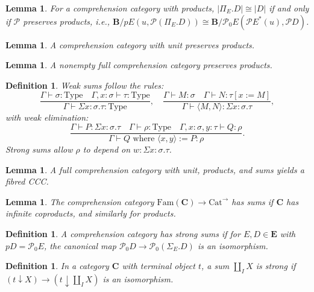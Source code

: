 \documentclass{article}
\theoremstyle{plain}
\newtheorem{lemma}[theorem]{Lemma}
\newtheorem{definition}[theorem]{Definition}
\theoremstyle{remark}
\begin{document}
\begin{lemma}
\label{lem:5.2}
For a comprehension category with products, $|\Pi_E . D| \cong |D|$ if and only if $\mathscr{P}$ preserves products, i.e., $\mathbf{B}/p E(u, \mathscr{P}(\Pi_E . D)) \cong \mathbf{B}/\mathscr{P}_0 E(\mathscr{P} E^*(u), \mathscr{P} D)$.
\end{lemma}

\begin{lemma}
\label{lem:5.3}
A comprehension category with unit preserves products.
\end{lemma}

\begin{lemma}
\label{lem:5.4}
A nonempty full comprehension category preserves products.
\end{lemma}

\begin{definition}
\label{def:5.5}
Weak sums follow the rules:
\[
\frac{\Gamma \vdash \sigma : \text{Type} \quad \Gamma, x : \sigma \vdash \tau : \text{Type}}{\Gamma \vdash \Sigma x : \sigma . \tau : \text{Type}}, \quad \frac{\Gamma \vdash M : \sigma \quad \Gamma \vdash N : \tau[x := M]}{\Gamma \vdash \langle M, N \rangle : \Sigma x : \sigma . \tau},
\]
with weak elimination:
\[
\frac{\Gamma \vdash P : \Sigma x : \sigma . \tau \quad \Gamma \vdash \rho : \text{Type} \quad \Gamma, x : \sigma, y : \tau \vdash Q : \rho}{\Gamma \vdash Q \text{ where } \langle x, y \rangle := P : \rho}.
\]
Strong sums allow $\rho$ to depend on $w : \Sigma x : \sigma . \tau$.
\end{definition}

\begin{lemma}
\label{lem:5.6}
A full comprehension category with unit, products, and sums yields a fibred CCC.
\end{lemma}

\begin{lemma}
\label{lem:5.7}
The comprehension category $\text{Fam}(\mathbf{C}) \to \text{Cat}^{\to}$ has sums if $\mathbf{C}$ has infinite coproducts, and similarly for products.
\end{lemma}

\begin{definition}
\label{def:5.8}
A comprehension category has \emph{strong sums} if for $E, D \in \mathbf{E}$ with $p D = \mathscr{P}_0 E$, the canonical map $\mathscr{P}_0 D \to \mathscr{P}_0 (\Sigma_E . D)$ is an isomorphism.
\end{definition}

\begin{definition}
\label{def:5.9}
In a category $\mathbf{C}$ with terminal object $t$, a sum $\amalg_I X$ is \emph{strong} if $(t \downarrow X) \to (t \downarrow \amalg_I X)$ is an isomorphism.
\end{definition}
\end{document}
